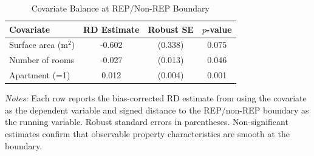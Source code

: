 \begin{table}[htbp]
\centering
\caption{Covariate Balance at REP/Non-REP Boundary}
\label{tab:balance}
\begin{tabular}{lccc}
\toprule
Covariate & RD Estimate & Robust SE & $p$-value \\
\midrule
Surface area (m$^2$) & -0.602 & (0.338) & 0.075 \\
Number of rooms & -0.027 & (0.013) & 0.046 \\
Apartment (=1) & 0.012 & (0.004) & 0.001 \\
\bottomrule
\end{tabular}
\begin{tablenotes}
\small
\item \textit{Notes:} Each row reports the bias-corrected RD estimate from \citet{cattaneo2020} using the covariate as the dependent variable and signed distance to the REP/non-REP boundary as the running variable. Robust standard errors in parentheses. Non-significant estimates confirm that observable property characteristics are smooth at the boundary.
\end{tablenotes}
\end{table}
